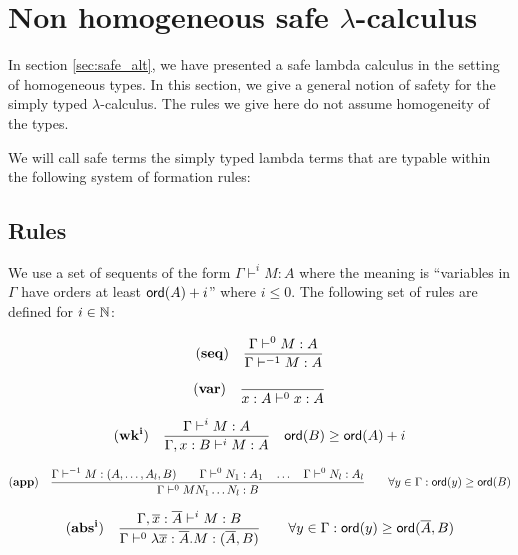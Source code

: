 \section{Non homogeneous safe $\lambda$-calculus}

In section \ref{sec:safe_alt}, we have presented a safe lambda
calculus in the setting of homogeneous types. In this section, we
give a general notion of safety for the simply typed
$\lambda$-calculus. The rules we give here do not assume homogeneity
of the types.

We will call safe terms the simply typed lambda terms that are
typable within the following system of formation rules:

\subsection{Rules}

 We use a set of sequents of the form $\Gamma \vdash^{i} M :
A$ where the meaning is ``variables in $\Gamma$ have orders at least
${\sf ord}(A)+i$'' where $i \leq 0$. The following set of rules are
defined for $i \in \mathbb{N}$:

$$ \mathbf{(seq)} \quad \frac{\displaystyle \Gamma \vdash^0 M : A}{\Gamma \vdash^{-1} M : A} $$

$$ \mathbf{(var)} \quad  \frac{\displaystyle }{x : A\vdash^{0} x : A} $$

$$ \mathbf{(wk^i)} \quad  \frac{\displaystyle \Gamma \vdash^i M : A}{\Gamma , x : B \vdash^i M : A} \quad {\sf ord}(B) \geq {\sf ord}(A) + i $$

$$ \mathbf{(app)} \quad  \frac{\displaystyle \Gamma \vdash^{-1} M : (A,\ldots,A_l,B)
                                        \qquad \Gamma \vdash^{0} N_1 : A_1
                                        \quad \ldots \quad \Gamma \vdash^{0} N_l : A_l  }{\Gamma  \vdash^0 M N_1 \ldots N_l : B}
                                    \qquad
                                   \forall y \in \Gamma : {\sf ord}(y) \geq {\sf ord}(B)$$

$$ \mathbf{(abs^i)} \quad  \frac{\displaystyle \Gamma, \overline{x} : \overline{A} \vdash^{i} M : B}{\Gamma  \vdash^{0} \lambda \overline{x} : \overline{A} . M : (\overline{A},B)} \qquad
                                   \forall y \in \Gamma : {\sf ord}(y) \geq {\sf ord}(\overline{A},B)$$


